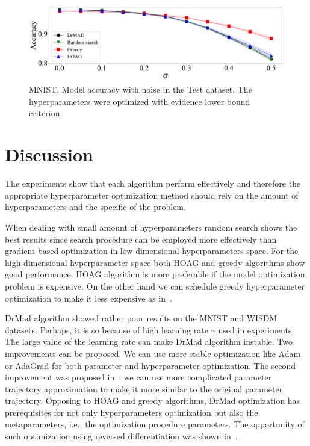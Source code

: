 \documentclass[smallcondensed]{svjour3}
\begin{document}
    \begin{figure}

    \includegraphics[width=\linewidth]{plots/Fig_noise2.pdf}

    \caption{MNIST, Model accuracy with noise in the Test dataset. The hyperparameters were optimized with evidence lower bound criterion.}
    \label{fig:noise}
    \end{figure}





\section{Discussion}
\label{discussion}
The experiments show that each algorithm perform effectively and therefore the appropriate hyperparameter optimization method should rely on the amount of hyperparameters and the specific of the problem. 

When dealing with small amount of hyperparameters random search shows the best results since search procedure can be employed more effectively than gradient-based optimization in low-dimensional hyperparameters space. For the high-dimensional hyperparameter space both  HOAG and greedy algorithms show good performance. 
HOAG algorithm is more preferable if the model optimization problem is expensive. On the other hand we can schedule greedy hyperparameter optimization to make it less expensive as in~\cite{hyper_greed}. 

DrMad algorithm showed rather poor results on the MNIST and WISDM datasets. Perhaps, it is so because of high learning rate $\gamma$ used in experiments. The large value of the learning rate can make DrMad algorithm instable. Two improvements can be proposed. We can use more stable optimization like Adam or AdaGrad for both parameter and hyperparameter optimization. The second improvement was proposed in~\cite{hyper_mad}: we can use more complicated parameter trajectory approximation to make it more similar to the original parameter trajectory. Opposing to HOAG and greedy algorithms, DrMad optimization has prerequisites for not only hyperparameters optimization but also the metaparameters, i.e., the optimization procedure parameters. The opportunity of such optimization using reversed differentiation was shown in~\cite{hyper_mad}. 
\end{document}
